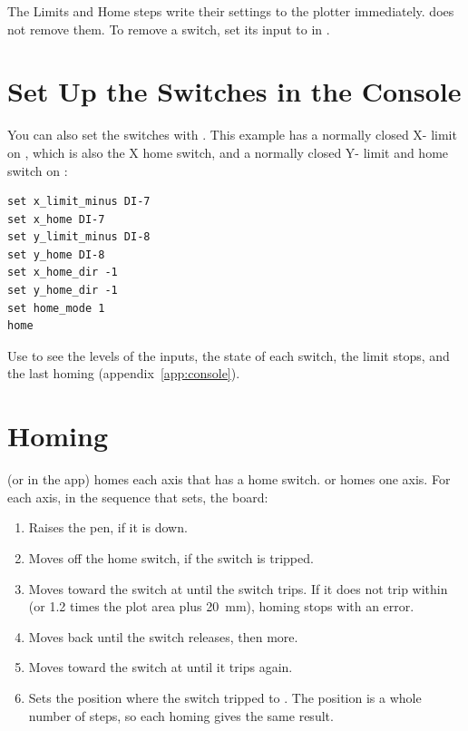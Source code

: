 \begin{note}
\notelabel The Limits and Home steps write their settings to the plotter
immediately.  does not remove them. To remove a switch, set its
input to  in .
\end{note}

\section{Set Up the Switches in the Console}

You can also set the switches with . This example has a normally
closed X- limit on , which is also the X home switch, and a
normally closed Y- limit and home switch on :

\begin{lstlisting}[language=console]
set x_limit_minus DI-7
set x_home DI-7
set y_limit_minus DI-8
set y_home DI-8
set x_home_dir -1
set y_home_dir -1
set home_mode 1
home
\end{lstlisting}

Use  to see the levels of the inputs, the state of each switch,
the limit stops, and the last homing (appendix~\ref{app:console}).

\section{Homing}\label{sec:homing}

 (or  in the app) homes each axis that has a home switch.
 or  homes one axis. For each axis, in the sequence
that  sets, the board:

\begin{enumerate}
  \item Raises the pen, if it is down.
  \item Moves off the home switch, if the switch is tripped.
  \item Moves toward the switch at  until the switch trips.
        If it does not trip within  (or 1.2 times the
        plot area plus 20~mm), homing stops with an error.
  \item Moves back until the switch releases, then  more.
  \item Moves toward the switch at  until it trips again.
  \item Sets the position where the switch tripped to . The
        position is a whole number of steps, so each homing gives the same
        result.
\end{enumerate}

